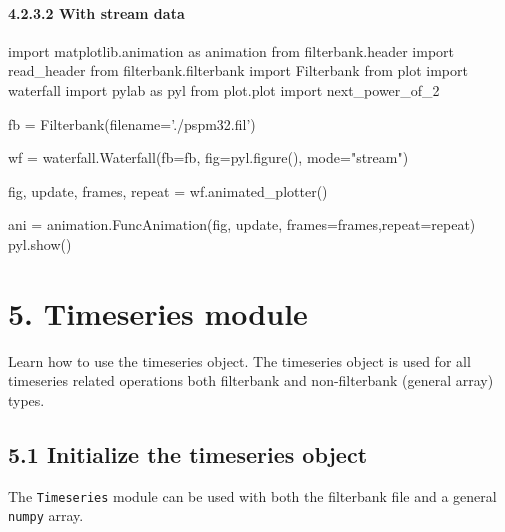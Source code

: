 \documentclass[]{article}
\newenvironment{Shaded}{}{}
\newcommand{\StringTok}[1]{\textcolor[rgb]{0.25,0.44,0.63}{#1}}
\newcommand{\ImportTok}[1]{#1}
\newcommand{\OperatorTok}[1]{\textcolor[rgb]{0.40,0.40,0.40}{#1}}
\newcommand{\NormalTok}[1]{#1}
\let\oldparagraph\paragraph
\renewcommand{\paragraph}[1]{\oldparagraph{#1}\mbox{}}
\begin{document}
\paragraph{4.2.3.2 With stream data}\label{with-stream-data}

\begin{Shaded}
\begin{Highlighting}[]
\ImportTok{import}\NormalTok{ matplotlib.animation }\ImportTok{as}\NormalTok{ animation}
\ImportTok{from}\NormalTok{ filterbank.header }\ImportTok{import}\NormalTok{ read_header}
\ImportTok{from}\NormalTok{ filterbank.filterbank }\ImportTok{import}\NormalTok{ Filterbank}
\ImportTok{from}\NormalTok{ plot }\ImportTok{import}\NormalTok{ waterfall}
\ImportTok{import}\NormalTok{ pylab }\ImportTok{as}\NormalTok{ pyl}
\ImportTok{from}\NormalTok{ plot.plot }\ImportTok{import}\NormalTok{ next_power_of_2}


\NormalTok{fb }\OperatorTok{=}\NormalTok{ Filterbank(filename}\OperatorTok{=}\StringTok{'./pspm32.fil'}\NormalTok{)}

\NormalTok{wf }\OperatorTok{=}\NormalTok{ waterfall.Waterfall(fb}\OperatorTok{=}\NormalTok{fb, fig}\OperatorTok{=}\NormalTok{pyl.figure(), mode}\OperatorTok{=}\StringTok{"stream"}\NormalTok{)}

\NormalTok{fig, update, frames, repeat }\OperatorTok{=}\NormalTok{ wf.animated_plotter()}

\NormalTok{ani }\OperatorTok{=}\NormalTok{ animation.FuncAnimation(fig, update, frames}\OperatorTok{=}\NormalTok{frames,repeat}\OperatorTok{=}\NormalTok{repeat)}
\NormalTok{pyl.show()}
\end{Highlighting}
\end{Shaded}

\section{5. Timeseries module}\label{timeseries-module}

Learn how to use the timeseries object. The timeseries object is used
for all timeseries related operations both filterbank and non-filterbank
(general array) types.

\subsection{5.1 Initialize the timeseries
object}\label{initialize-the-timeseries-object}

The \texttt{Timeseries} module can be used with both the filterbank file
and a general \texttt{numpy} array.
\end{document}
